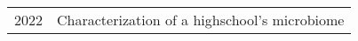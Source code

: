 \begin{longtable}[l]{@{}p{} p{}}

    2022 & Characterization of a highschool's microbiome\\

\end{longtable}
